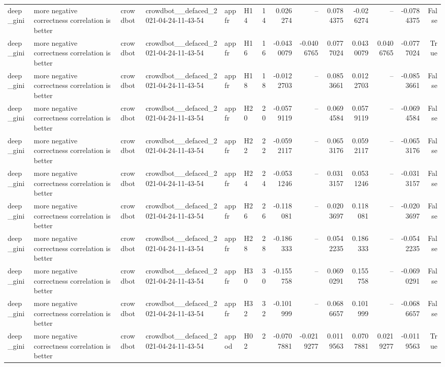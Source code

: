 \begin{longtable}{llllllrrrrrrrr}
deep\_gini & more negative correctness correlation is better & crowdbot & crowdbot\_\_defaced\_2021-04-24-11-43-54 & appfr & H14 & 14 & 0.026274 & -- & 0.0784375 & -0.026274 & -- & -0.0784375 & False \\
deep\_gini & more negative correctness correlation is better & crowdbot & crowdbot\_\_defaced\_2021-04-24-11-43-54 & appfr & H16 & 16 & -0.0430079 & -0.0406765 & 0.0777024 & 0.0430079 & 0.0406765 & -0.0777024 & True \\
deep\_gini & more negative correctness correlation is better & crowdbot & crowdbot\_\_defaced\_2021-04-24-11-43-54 & appfr & H18 & 18 & -0.0122703 & -- & 0.0853661 & 0.0122703 & -- & -0.0853661 & False \\
deep\_gini & more negative correctness correlation is better & crowdbot & crowdbot\_\_defaced\_2021-04-24-11-43-54 & appfr & H20 & 20 & -0.0579119 & -- & 0.0694584 & 0.0579119 & -- & -0.0694584 & False \\
deep\_gini & more negative correctness correlation is better & crowdbot & crowdbot\_\_defaced\_2021-04-24-11-43-54 & appfr & H22 & 22 & -0.0592117 & -- & 0.0653176 & 0.0592117 & -- & -0.0653176 & False \\
deep\_gini & more negative correctness correlation is better & crowdbot & crowdbot\_\_defaced\_2021-04-24-11-43-54 & appfr & H24 & 24 & -0.0531246 & -- & 0.0313157 & 0.0531246 & -- & -0.0313157 & False \\
deep\_gini & more negative correctness correlation is better & crowdbot & crowdbot\_\_defaced\_2021-04-24-11-43-54 & appfr & H26 & 26 & -0.118081 & -- & 0.0203697 & 0.118081 & -- & -0.0203697 & False \\
deep\_gini & more negative correctness correlation is better & crowdbot & crowdbot\_\_defaced\_2021-04-24-11-43-54 & appfr & H28 & 28 & -0.186333 & -- & 0.0542235 & 0.186333 & -- & -0.0542235 & False \\
deep\_gini & more negative correctness correlation is better & crowdbot & crowdbot\_\_defaced\_2021-04-24-11-43-54 & appfr & H30 & 30 & -0.155758 & -- & 0.0690291 & 0.155758 & -- & -0.0690291 & False \\
deep\_gini & more negative correctness correlation is better & crowdbot & crowdbot\_\_defaced\_2021-04-24-11-43-54 & appfr & H32 & 32 & -0.101999 & -- & 0.0686657 & 0.101999 & -- & -0.0686657 & False \\
deep\_gini & more negative correctness correlation is better & crowdbot & crowdbot\_\_defaced\_2021-04-24-11-43-54 & appod & H02 & 2 & -0.0707881 & -0.0219277 & 0.0119563 & 0.0707881 & 0.0219277 & -0.0119563 & True \\

\end{longtable}
